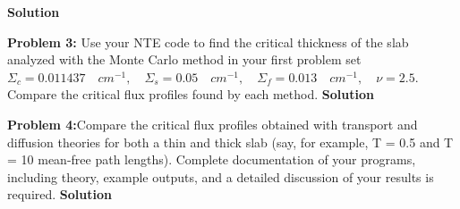 \documentclass{amsart}
\theoremstyle{definition}
\begin{document}
\textbf{Solution}
 
\newpage
\textbf{Problem 3:} Use your NTE code to find the critical thickness of the slab analyzed with the Monte Carlo method in your first problem set $\Sigma_c = 0.011437\quad cm^{-1}, \quad \Sigma_s = 0.05\quad cm^{-1}, \quad \Sigma_f = 0.013\quad cm^{-1}, \quad \nu=2.5$. Compare the critical flux profiles found by each method.
\bigbreak
\textbf{Solution}
 
\newpage
\textbf{Problem 4:}Compare the critical flux profiles obtained with transport and diffusion theories for both a thin and thick slab (say, for example, T = 0.5 and T = 10 mean-free path lengths).
\bigbreak
Complete documentation of your programs, including theory, example outputs, and a detailed discussion of your results is required.
\bigbreak
\textbf{Solution}
 
\end{document}
